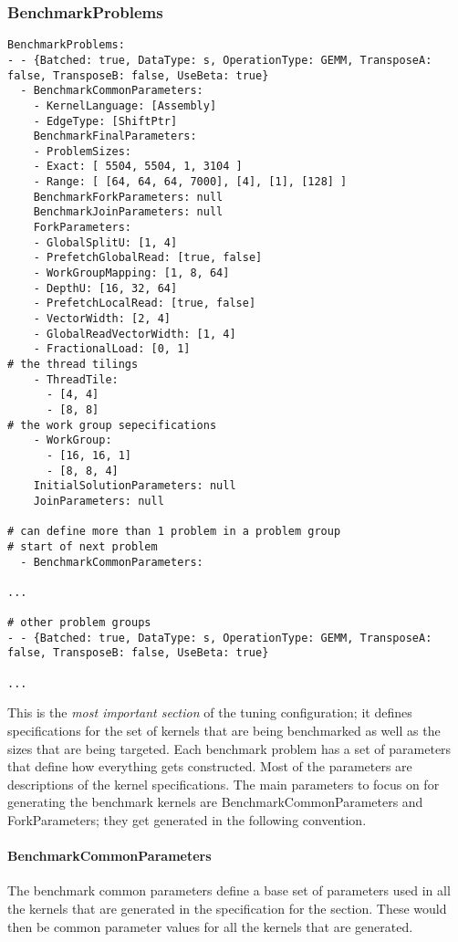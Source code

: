 \documentclass[]{article}
\begin{document}
\subsubsection{BenchmarkProblems}
\begin{verbatim}
BenchmarkProblems:
- - {Batched: true, DataType: s, OperationType: GEMM, TransposeA: false, TransposeB: false, UseBeta: true}
  - BenchmarkCommonParameters:
    - KernelLanguage: [Assembly]
    - EdgeType: [ShiftPtr]
    BenchmarkFinalParameters:
    - ProblemSizes:
    - Exact: [ 5504, 5504, 1, 3104 ]
    - Range: [ [64, 64, 64, 7000], [4], [1], [128] ]
    BenchmarkForkParameters: null
    BenchmarkJoinParameters: null
    ForkParameters:
    - GlobalSplitU: [1, 4]
    - PrefetchGlobalRead: [true, false]
    - WorkGroupMapping: [1, 8, 64]
    - DepthU: [16, 32, 64]
    - PrefetchLocalRead: [true, false]
    - VectorWidth: [2, 4]
    - GlobalReadVectorWidth: [1, 4]
    - FractionalLoad: [0, 1]
# the thread tilings
    - ThreadTile:
      - [4, 4]
      - [8, 8]
# the work group sepecifications
    - WorkGroup:
      - [16, 16, 1]
      - [8, 8, 4]
    InitialSolutionParameters: null
    JoinParameters: null

# can define more than 1 problem in a problem group
# start of next problem
  - BenchmarkCommonParameters:

...

# other problem groups
- - {Batched: true, DataType: s, OperationType: GEMM, TransposeA: false, TransposeB: false, UseBeta: true}

...

\end{verbatim}

This is the \textit{most important section} of the tuning configuration; it defines specifications for the set of kernels that are being benchmarked as well as the sizes that are being targeted. Each benchmark problem has a set of parameters that define how everything gets constructed. Most of the parameters are descriptions of the kernel specifications. The main parameters to focus on for generating the benchmark kernels are BenchmarkCommonParameters and ForkParameters; they get generated in the following convention.

\paragraph{BenchmarkCommonParameters} The benchmark common parameters define a base set of parameters used in all the kernels that are generated in the specification for the section. These would then be common parameter values for all the kernels that are generated.
\end{document}
